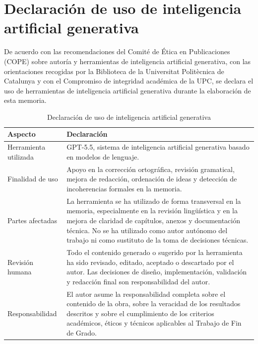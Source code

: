 \chapter*{Declaración de uso de inteligencia artificial generativa}

De acuerdo con las recomendaciones del Comité de Ética en Publicaciones
(COPE) sobre autoría y herramientas de inteligencia artificial generativa, con
las orientaciones recogidas por la Biblioteca de la Universitat Politècnica de
Catalunya y con el Compromiso de integridad académica de la UPC, se declara el
uso de herramientas de inteligencia artificial generativa durante la elaboración
de esta memoria.

\begin{table}[H]
  \centering
  \caption{Declaración de uso de inteligencia artificial generativa}
  \label{tab:declaracion-ia}
  \begin{tabularx}{\textwidth}{p{}X}
    \toprule
    Aspecto & Declaración \\
    \midrule
    Herramienta utilizada & GPT-5.5, sistema de inteligencia artificial generativa basado en modelos de lenguaje. \\
    Finalidad de uso & Apoyo en la corrección ortográfica, revisión gramatical, mejora de redacción, ordenación de ideas y detección de incoherencias formales en la memoria. \\
    Partes afectadas & La herramienta se ha utilizado de forma transversal en la memoria, especialmente en la revisión lingüística y en la mejora de claridad de capítulos, anexos y documentación técnica. No se ha utilizado como autor autónomo del trabajo ni como sustituto de la toma de decisiones técnicas. \\
    Revisión humana & Todo el contenido generado o sugerido por la herramienta ha sido revisado, editado, aceptado o descartado por el autor. Las decisiones de diseño, implementación, validación y redacción final son responsabilidad del autor. \\
    Responsabilidad & El autor asume la responsabilidad completa sobre el contenido de la obra, sobre la veracidad de los resultados descritos y sobre el cumplimiento de los criterios académicos, éticos y técnicos aplicables al Trabajo de Fin de Grado. \\
    \bottomrule
  \end{tabularx}
\end{table}

